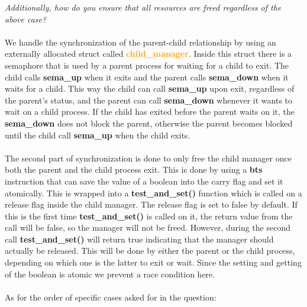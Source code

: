 \documentclass{report}
\newcommand{\question}[1]{\textit{#1} \ }
\newcommand{\fun}[1]{\textcolor{Emerald}{\textbf{#1}}}
\newcommand{\struct}[1]{\textcolor{orange}{\textbf{#1}}}
\begin{document}
                \question{Additionally, how do you ensure that all resources are freed regardless of the above case?}
                  \\
                  \\ We handle the synchronization of the parent-child relationship by using an externally allocated struct called \struct{child\_manager}.
                  Inside this struct there is a semaphore that is used by a parent process for waiting for a child to exit. The child calls \fun{sema\_up} when it exits
                  and the parent calls \fun{sema\_down} when it waits for a child. This way the child can call \fun{sema\_up} upon exit, regardless of the parent's status, and the parent can call \fun{sema\_down} whenever it wants to wait on a child process.
                  If the child has exited before the parent waits on it, the \fun{sema\_down} does not block the parent, otherwise the parent becomes blocked until the child call \fun{sema\_up} when the child exits. 
                \\
                \\ The second part of synchronization is done to only free the child manager once both the parent and the child process exit.
                This is done by using a \fun{bts} instruction that can save the value of a boolean into the carry flag and set it atomically. This is
                wrapped into a \fun{test\_and\_set()} function which is called on a release flag inside the child manager. The release flag is set to false by default.
                If this is the first time \fun{test\_and\_set()} is called on it, the return value from the call will be false, so the manager will not be freed.
                However, during the second call \fun{test\_and\_set()} will return true indicating that the manager should actually be released. This will be
                done by either the parent or the child process, depending on which one is the latter to exit or wait. Since the setting and getting of the boolean is
                atomic we prevent a race condition here.
                  \\
                  \\ As for the order of specific cases asked for in the question:
\end{document}
